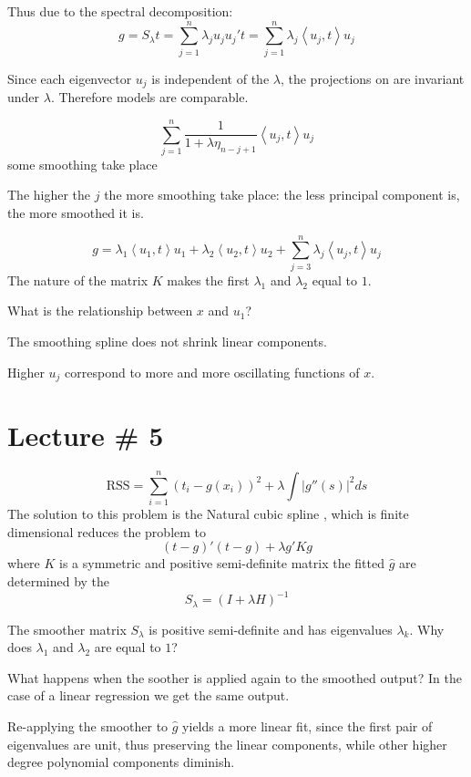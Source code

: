 \documentclass[a4paper]{article}
\newcommand{\brac}[1]{{\left ( #1 \right )}}
\newcommand{\abs}[1]{{\left | #1 \right |}}
\newcommand{\brkt}[1]{{\left\langle #1 \right\rangle}}
\newcommand{\RSS}{\text{RSS}}
\begin{document}
Thus due to the spectral decomposition:
\[g = S_\lambda t = \sum_{j=1}^n \lambda_j u_j u_j' t = \sum_{j=1}^n \lambda_j \brkt{u_j, t} u_j \]

Since each eigenvector $u_j$ is independent of the $\lambda$, the projections on are invariant under $\lambda$. Therefore models are comparable.

\[\sum_{j=1}^n \frac{1}{1+\lambda\eta_{n-j+1}} \brkt{u_j, t} u_j\]
some smoothing take place

The higher the $j$ the more smoothing take place:
	the less principal component is, the more smoothed it is.

\[g = \lambda_1\brkt{u_1, t} u_1 + \lambda_2\brkt{u_2, t} u_2 + \sum_{j=3}^n \lambda_j \brkt{u_j, t} u_j \]
The nature of the matrix $K$ makes the first $\lambda_1$ and $\lambda_2$ equal to $1$.

What is the relationship between $x$ and $u_1$?

The smoothing spline does not shrink linear components.

Higher $u_j$ correspond to more and more oscillating functions of $x$.




\clearpage
\section{Lecture \# 5} %
\label{sec:lecture_5}

\[\RSS = \sum_{i=1}^n \brac{t_i - g(x_i)}^2 + \lambda \int \abs{g''(s)}^2ds\]
The solution to this problem is the Natural cubic spline , which is finite dimensional reduces the problem to
\[\brac{t-g}'\brac{t-g} + \lambda g'K g\]
where $K$ is a symmetric and positive  semi-definite matrix
the fitted $\hat{g}$ are determined by the 
\[S_\lambda = \brac{I+\lambda H}^{-1}\]

The smoother matrix $S_\lambda$ is positive semi-definite and has eigenvalues $\lambda_k$. Why does $\lambda_1$ and $\lambda_2$ are equal to $1$?


What happens when the soother is applied again to the smoothed output?
In the case of a linear regression we get the same output.

Re-applying the smoother to $\hat{g}$ yields a more linear fit, since the first pair of eigenvalues are unit, thus preserving the linear components, while other higher degree polynomial components diminish.
\end{document}
